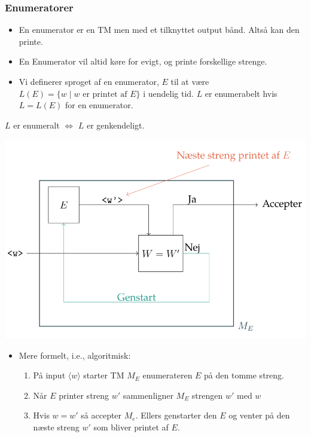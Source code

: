 \begin{frame}[allowframebreaks]
  \frametitle{Enumeratorer}
\begin{itemize}
  \item En enumerator er en TM men med et tilknyttet output bånd. Altså kan den printe.
  \item En Enumerator vil altid køre for evigt, og printe forskellige strenge.
  \item Vi definerer sproget af en enumerator, $E$ til at være $L(E) = \{w \mid w \text{ er printet af } E\}$ i uendelig tid. $L$ er enumerabelt hvis $L = L(E)$ for en enumerator.
\end{itemize}

\begin{theorem}
$L$ er enumeralt $\iff$ $L$ er genkendeligt.
\end{theorem}

\includegraphics[scale=0.3]{figur/noter37.png}

\begin{itemize}
  \item Mere formelt, i.e., algoritmisk:
        \begin{enumerate}
          \item På input $\langle w \rangle$ starter TM $M_{E}$ enumerateren $E$ på den tomme streng.
          \item Når $E$ printer streng $w'$ sammenligner $M_{E}$ strengen $w'$ med $w$
          \item Hvis $w = w'$ så accepter $M_{e}$. Ellers genstarter den $E$ og venter på den næste streng $w'$ som bliver printet af $E$.
        \end{enumerate}

\end{itemize}
\end{frame}

